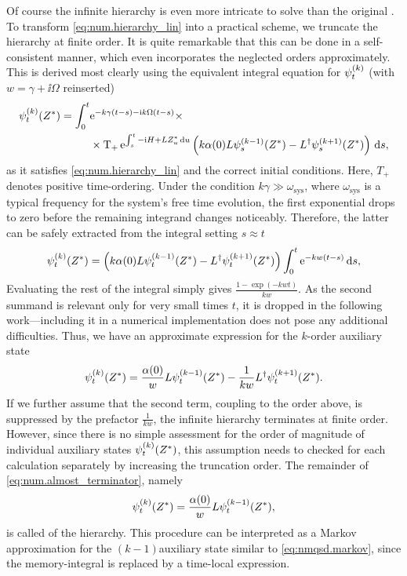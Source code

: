Of course the infinite hierarchy is even more intricate to solve than the original {\NMSSE}.
To transform \autoref{eq:num.hierarchy_lin} into a practical scheme, we truncate the hierarchy at finite order.
It is quite remarkable that this can be done in a self-consistent manner, which even incorporates the neglected orders approximately.
This is derived most clearly using the equivalent integral equation for $\psit[k]$ (with $w = \gamma + \ii\Omega$ reinserted)
\begin{align}
  \psitZ[k] = \int_0^t &\exp[-k\gamma(t-s) - \ii k\Omega(t-s)] \times \nonumber\\
  &\times \Texp[\int_s^t -\ii\Hsys + L\ZZ_u \dd u] \left( k \alpha(0)L\psi_s^{(k-1)}(\ZZ) - \adj{L} \psi_s^{(k+1)}(\ZZ) \right) \dd s,
  \label{eq:num.terminator_integral}
\end{align}
as it satisfies \autoref{eq:num.hierarchy_lin} and the correct initial conditions.
Here, $T_+$ denotes positive time-ordering.
Under the condition $k\gamma \gg \omega_\mathrm{sys}$, where $\omega_\mathrm{sys}$ is a typical frequency for the system's free time evolution, the first exponential drops to zero before the remaining integrand changes noticeably.
Therefore, the latter can be safely extracted from the integral setting $s \approx t$
\begin{equation*}
  \psitZ[k] = \left( k \alpha(0)L\psitZ[k-1] - \adj{L} \psitZ[k+1] \right) \int_0^t \exp[-kw(t-s)]  \dd s,
\end{equation*}
Evaluating the rest of the integral simply gives $\frac{1 - \exp(-kwt)}{kw}$.
As the second summand is relevant only for very small times $t$, it is dropped in the following work---including it in a numerical implementation does not pose any additional difficulties.
Thus, we have an approximate expression for the $k$\th-order auxiliary state
\begin{equation}
  \psitZ[k] = \frac{\alpha(0)}{w} L\psitZ[k-1] - \frac{1}{kw} \adj{L} \psitZ[k+1].
  \label{eq:num.almost_terminator}
\end{equation}
If we further assume that the second term, coupling to the order above, is suppressed by the prefactor $\frac{1}{kw}$, the infinite hierarchy terminates at finite order.
However, since there is no simple assessment for the order of magnitude of individual auxiliary states $\psitZ[k]$, this assumption needs to checked for each calculation separately by increasing the truncation order.
The remainder of \autoref{eq:num.almost_terminator}, namely
\begin{equation}
  \psitZ[k] = \frac{\alpha(0)}{w} L \psitZ[k-1],
  \label{eq:num.terminator}
\end{equation}
is called  of the hierarchy.
This procedure can be interpreted as a Markov approximation for the $(k-1)$\th auxiliary state similar to \autoref{eq:nmqsd.markov}, since the memory-integral is replaced by a time-local expression.

